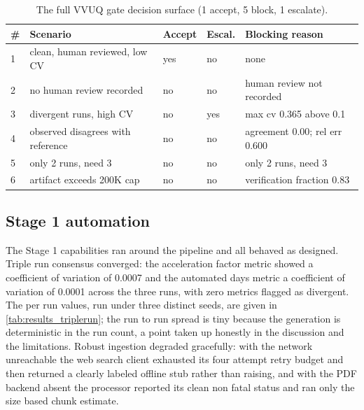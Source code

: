 \begin{table}[H]
\caption{The full VVUQ gate decision surface (1 accept, 5 block, 1 escalate).}
\label{tab:results_gate}
\centering
\begin{tabularx}{\textwidth}{C{0.6cm} L{5.7cm} C{1.3cm} C{1.3cm} >{\raggedright\arraybackslash}X}
\toprule
\textbf{\#} & \textbf{Scenario} & \textbf{Accept} & \textbf{Escal.} & \textbf{Blocking reason} \\
 & clean, human reviewed, low CV     & yes & no  & none \\
  2 & no human review recorded          & no  & no  & human review not recorded \\
  3 & divergent runs, high CV           & no  & yes & max cv 0.365 above 0.1 \\
  4 & observed disagrees with reference & no  & no  & agreement 0.00; rel err 0.600 \\
  5 & only 2 runs, need 3               & no  & no  & only 2 runs, need 3 \\
  6 & artifact exceeds 200K cap         & no  & no  & verification fraction 0.83 \\
\bottomrule
\end{tabularx}
\end{table}

\subsection{Stage 1 automation}

The Stage 1 capabilities ran around the pipeline and all behaved as designed.
Triple run consensus converged: the acceleration factor metric showed a
coefficient of variation of 0.0007 and the automated days metric a coefficient of
variation of 0.0001 across the three runs, with zero metrics flagged as
divergent. The per run values, run under three distinct seeds, are given in
\autoref{tab:results_triplerun}; the run to run spread is tiny because the
generation is deterministic in the run count, a point taken up honestly in the
discussion and the limitations. Robust ingestion degraded gracefully: with the network unreachable the
web search client exhausted its four attempt retry budget and then returned a
clearly labeled offline stub rather than raising, and with the PDF backend absent
the processor reported its clean non fatal status and ran only the size based
chunk estimate. 

